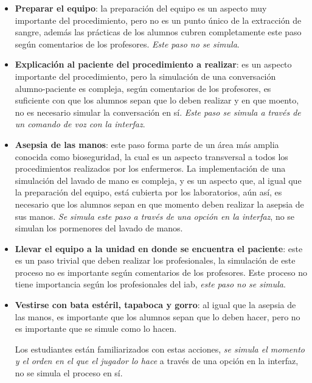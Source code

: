 \begin{itemize}

\item \textbf{Preparar el equipo}: la preparación del equipo es un aspecto muy
    importante del procedimiento, pero no es un punto único de la extracción de
    sangre, además las prácticas de los alumnos cubren completamente este paso
    según comentarios de los profesores. \emph{Este paso no se simula}.

\item \textbf{Explicación al paciente del procedimiento a realizar}: es un
    aspecto importante del procedimiento, pero la simulación de una conversación
    alumno-paciente es compleja, según comentarios de los profesores, es
    suficiente con que los alumnos sepan que lo deben realizar y en que moento,
    no es necesario simular la conversación en sí. \emph{Este paso se simula a
        través de un comando de voz con la interfaz}.

\item \textbf{Asepsia de las manos}: este paso forma parte de un área más amplia
    conocida como bioseguridad, la cual es un aspecto transversal a todos los
    procedimientos realizados por los enfermeros. 
    La implementación de una simulación del lavado de mano es compleja, y es un
    aspecto que, al igual que la preparación del equipo, está cubierta por los
    laboratorios, aún así, es necesario que los alumnos sepan en que momento
    deben realizar la asepsia de sus manos. \emph{Se simula este paso a través de una
        opción en la interfaz}, no se simulan los pormenores del lavado de manos.

\item \textbf{Llevar el equipo a la unidad en donde se encuentra el paciente}:
    este es un paso trivial que deben realizar los profesionales, la simulación
    de este proceso no es importante según comentarios de los profesores. Este
    proceso no tiene importancia según los profesionales del \Gls{iab}, \emph{este
        paso no se simula}.

\item \textbf{Vestirse con bata estéril, tapaboca y gorro}: al igual que la
    asepsia de las manos, es importante que los alumnos sepan que lo deben
    hacer, pero no es importante que se simule como lo hacen. 

    Los estudiantes están familiarizados con estas acciones, \emph{se simula el
        momento y el orden en el que el jugador lo hace} a través de una opción
    en la interfaz, no se simula el proceso en sí.


\end{itemize}
